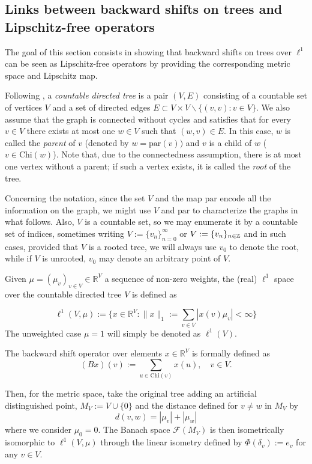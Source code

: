 \documentclass[12pt,english]{amsart}
\numberwithin{equation}{section}
\theoremstyle{plain}
\theoremstyle{definition}
\newcommand{\R}{\mathbb{R}}
\def\ZZ{\Bbb Z}
\def\RR{\mathbb{R}}
\def\pare{\text{par}}
\def\chil{\text{Chi}}
\newcommand{\free}[1]{\mathcal{F}(#1)}
\begin{document}
\subsection{Links between backward shifts on trees and Lipschitz-free operators}
\label{subsec:shifts-M}




The goal of this section consists in showing that backward shifts on trees over $\ell^1$ can be seen as Lipschitz-free operators by providing the corresponding metric space and Lipschitz map.


Following \cite{GEPa23}, 
a \textit{countable directed tree} is a pair $(V,E)$ consisting of a countable set of vertices $V$ and a set of directed edges $E\subset V\times V\backslash \{(v,v):v\in V\}$. We also assume that the graph is connected without cycles and satisfies that for every $v\in V$ there exists at most one $w\in V$ such that $(w,v)\in E$. In this case,  $w$ is called the \textit{parent} of $v$ (denoted by $w=\pare(v))$ and $v$ is a child of $w$ ($v\in \chil(w)$). Note that, due to the connectedness assumption, there is at most one vertex without a parent; if such a vertex exists, it is called the \textit{root} of the tree. 

Concerning the notation, since the set $V$ and the map $\pare$ encode all the information on the graph, we might use $V$ and $\pare$ to characterize the graphs in what follows. Also, $V$ is a countable set, so we may enumerate it by a countable set of indices, sometimes writing $V:=\{v_n\}_{n=0}^\infty$ or $V:=\{v_n\}_{n\in \ZZ}$ and in such cases, provided that $V$ is a rooted tree, we will always use $v_0$ to denote the root, while if $V$ is unrooted, $v_0$ may denote an arbitrary point of $V$.  

Given $\mu=(\mu_v)_{v\in V}\in \R^V$ a sequence of non-zero weights, the (real) $\ell^1$ space over the countable directed tree $V$ is defined as

\[\ell^1(V,\mu):= \{x\in \RR^V: \|x\|_1:= \sum_{v\in V} |x(v)\mu_v| < \infty \} \]
The unweighted case $\mu=1$ will simply be denoted as $\ell^1(V)$.

The backward shift operator over elements $x\in \RR^V$ is formally defined as 
\[(B x)(v):= \sum_{u\in \chil(v)} x(u), \quad  v\in V.\]



Then, for the metric space, take the original tree adding an artificial distinguished point, $M_V:=V \cup \{0\}$ and the distance defined for $v\ne w$ in $M_V$ by
\[
d(v,w)= |\mu_v|+|\mu_w|
\]
where we consider $\mu_0=0$. The Banach space $\free{M_V}$ is then isometrically isomorphic to $ \ell^1(V,\mu)$ through the linear isometry defined by $\Phi(\delta_v):=e_v$ for any $v\in V$.
\end{document}
